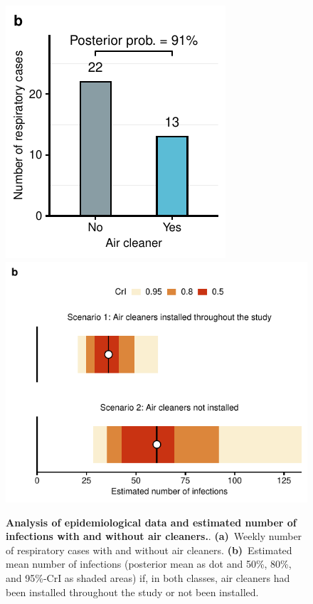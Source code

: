 \documentclass[fleqn,11pt]{wlscirep}
\begin{document}
\begin{figure}[!htpb]
    \includegraphics{../../results/epi-data/cases_by_condition.pdf} 
    \includegraphics{../../results/epi-data/avoided-infections.pdf}
    \caption{\textbf{Analysis of epidemiological data and estimated number of infections with and without air cleaners.}. \textbf{(a)}~Weekly number of respiratory cases with and without air cleaners. \textbf{(b)}~Estimated mean number of infections (posterior mean as dot and 50\%, 80\%, and 95\%-CrI as shaded areas) if, in both classes, air cleaners had been installed throughout the study or not been installed.}
    \label{fig:redcap-results}
\end{figure}
\end{document}
